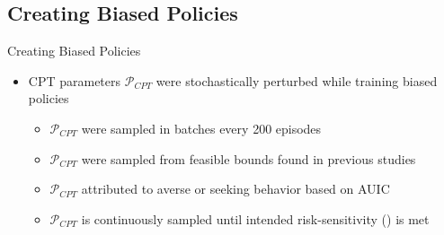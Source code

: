 \documentclass[aspectratio=1610, xcolor=dvipsnames]{packages/beamer}
\begin{document}
\subsection{Creating Biased Policies}\begin{frame}{Creating Biased Policies}
    \begin{itemize}
        \item \Ac{CPT} parameters $\mathcal{P}_{CPT}$ were stochastically perturbed while training biased policies
        \begin{itemize}
            \item $\mathcal{P}_{CPT}$ were sampled in batches every 200 episodes
            \item $\mathcal{P}_{CPT}$ were sampled from feasible bounds found in previous studies
            \item $\mathcal{P}_{CPT}$ attributed to averse or seeking behavior based on \ac{AUIC}
            \item $\mathcal{P}_{CPT}$ is continuously sampled until intended risk-sensitivity () is met
        \end{itemize}

    \end{itemize}
\end{frame}
\end{document}
